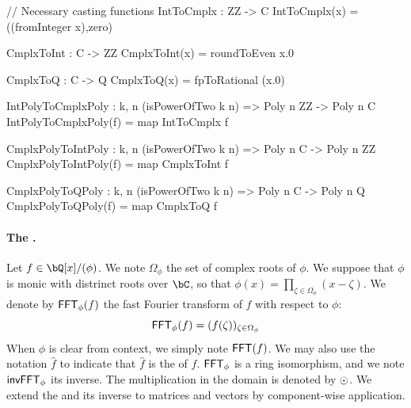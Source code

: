 \begin{code}
  // Necessary casting functions
  IntToCmplx : ZZ -> C
  IntToCmplx(x) = ((fromInteger x),zero)

  CmplxToInt : C -> ZZ
  CmplxToInt(x) = roundToEven x.0

  CmplxToQ : C -> Q
  CmplxToQ(x) = fpToRational (x.0)

  IntPolyToCmplxPoly : {k, n} (isPowerOfTwo k n) => Poly n ZZ -> Poly n C
  IntPolyToCmplxPoly(f) = map IntToCmplx f

  CmplxPolyToIntPoly : {k, n} (isPowerOfTwo k n) => Poly n C -> Poly n ZZ
  CmplxPolyToIntPoly(f) = map CmplxToInt f

  CmplxPolyToQPoly : {k, n} (isPowerOfTwo k n) => Poly n C -> Poly n Q
  CmplxPolyToQPoly(f) = map CmplxToQ f
\end{code}
 
 \paragraph{The \fft.} Let $f \in \bQ[x]/(\phi)$. We note $\Omega_\phi$ the set of complex roots of $\phi$. We suppose that $\phi$ is monic with distrinct roots over $\bC$, so that $\phi(x) = \prod\limits_{\zeta \in \Omega_\phi} (x - \zeta)$. We denote by $\textsf{FFT}_\phi(f)$ the fast Fourier transform of $f$ with respect to $\phi$:
 \begin{equation}
  \textsf{FFT}_\phi(f) = (f(\zeta))_{\zeta \in \Omega_\phi}
 \end{equation}
 When $\phi$ is clear from context, we simply note $\textsf{FFT}(f)$. We may also use the notation $\hat f$ to indicate that $\hat f$ is the \fft of $f$. $\textsf{FFT}_\phi$ is a ring isomorphism, and we note $\textsf{invFFT}_\phi$ its inverse. The multiplication in the \fft domain is denoted by $ \odot $. We extend the \fft and its inverse to matrices and vectors by component-wise application.

